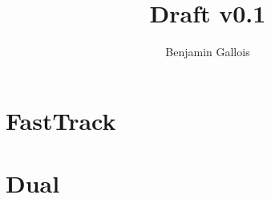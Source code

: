 \documentclass[12pt,a4paper]{report}
\title{Draft v0.1}
\author{Benjamin Gallois}
\begin{document}
\maketitle



\tableofcontents

\part{FastTrack}


\part{Dual}




\end{document}
